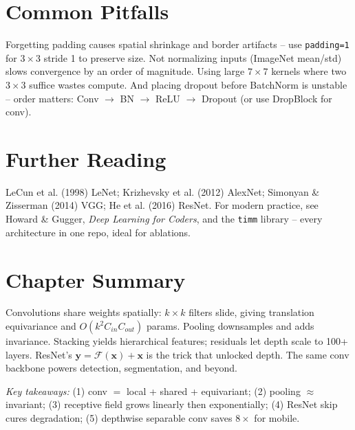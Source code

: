 \section{Common Pitfalls}
Forgetting padding causes spatial shrinkage and border artifacts -- use
\texttt{padding=1} for $3\times3$ stride 1 to preserve size. Not normalizing
inputs (ImageNet mean/std) slows convergence by an order of magnitude. Using
large $7\times7$ kernels where two $3\times3$ suffice wastes compute. And
placing dropout before BatchNorm is unstable -- order matters: Conv $\to$ BN
$\to$ ReLU $\to$ Dropout (or use DropBlock for conv).

\section{Further Reading}
LeCun et al. (1998) LeNet; Krizhevsky et al. (2012) AlexNet; Simonyan \&
Zisserman (2014) VGG; He et al. (2016) ResNet. For modern practice, see
Howard \& Gugger, \emph{Deep Learning for Coders}, and the \texttt{timm}
library -- every architecture in one repo, ideal for ablations.

\section{Chapter Summary}
Convolutions share weights spatially: $k\times k$ filters slide, giving
translation equivariance and $O(k^2C_{in}C_{out})$ params. Pooling downsamples
and adds invariance. Stacking yields hierarchical features; residuals let depth
scale to 100+ layers. ResNet's $\mathbf{y}=\mathcal{F}(\mathbf{x})+\mathbf{x}$
is the trick that unlocked depth. The same conv backbone powers detection,
segmentation, and beyond.

\smallskip
\noindent\textit{Key takeaways:} (1) conv $=$ local + shared + equivariant;
(2) pooling $\approx$ invariant; (3) receptive field grows linearly then
exponentially; (4) ResNet skip cures degradation; (5) depthwise separable
conv saves $8\times$ for mobile.

